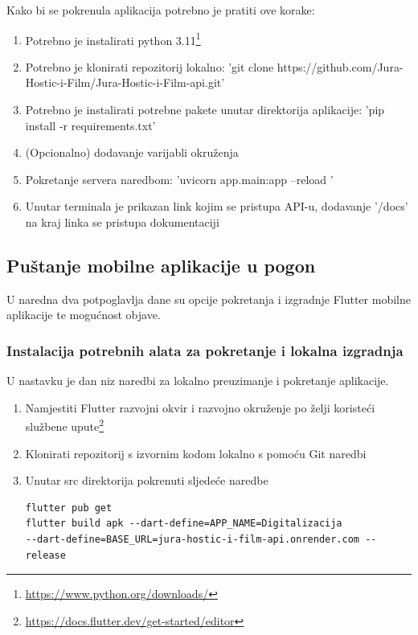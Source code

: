 			{Kako bi se pokrenula aplikacija potrebno je pratiti ove korake:}
			
			\begin{enumerate}
				\item{Potrebno je instalirati python 3.11\footnote{\url{https://www.python.org/downloads/}}}
				\item{Potrebno je klonirati repozitorij lokalno: 'git clone https://github.com/Jura-Hostic-i-Film/Jura-Hostic-i-Film-api.git'}
				\item{Potrebno je instalirati potrebne pakete unutar direktorija aplikacije: 'pip install -r requirements.txt'}
				\item{(Opcionalno) dodavanje varijabli okruženja}
				\item{Pokretanje servera naredbom: 'uvicorn app.main:app --reload '}
				\item{Unutar terminala je prikazan link kojim se pristupa API-u, dodavanje '/docs' na kraj linka se pristupa dokumentaciji}
			\end{enumerate}
			
			\subsection{Puštanje mobilne aplikacije u pogon}
			
			{U naredna dva potpoglavlja dane su opcije pokretanja i izgradnje Flutter mobilne aplikacije te mogućnost objave.}
			
			\subsubsection{Instalacija potrebnih alata za pokretanje i lokalna izgradnja}
			
			{U nastavku je dan niz naredbi za lokalno preuzimanje i pokretanje aplikacije.}
			\begin{enumerate}
			\item{Namjestiti Flutter razvojni okvir i razvojno okruženje po želji koristeći službene upute\footnote{\url{https://docs.flutter.dev/get-started/editor}}}
			\item{Klonirati repozitorij s izvornim kodom lokalno s pomoću Git naredbi}
			\item{Unutar src direktorija pokrenuti sljedeće naredbe}
			\begin{verbatim}
flutter pub get
flutter build apk --dart-define=APP_NAME=Digitalizacija 
--dart-define=BASE_URL=jura-hostic-i-film-api.onrender.com --release
			\end{verbatim}
			\end{enumerate}
			
